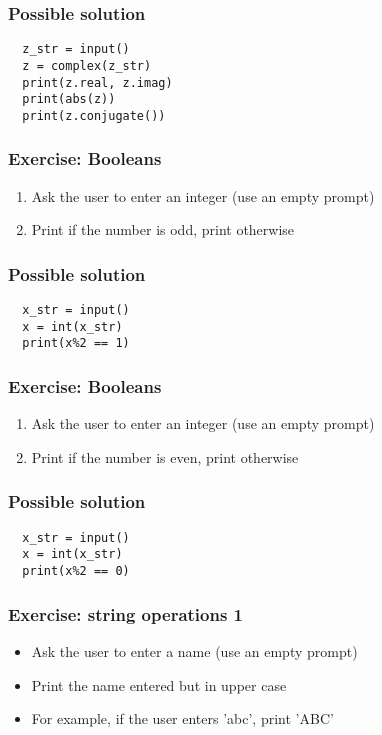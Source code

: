 \documentclass[14pt,compress]{beamer}
\begin{document}
\begin{frame}
\frametitle{Possible solution}
\begin{lstlisting}
  z_str = input()
  z = complex(z_str)
  print(z.real, z.imag)
  print(abs(z))
  print(z.conjugate())
\end{lstlisting}

\end{frame}

\begin{frame}[plain]
  \frametitle{Exercise: Booleans}
  \begin{enumerate}
  \item Ask the user to enter an integer (use an empty prompt)
  \item Print  if the number is odd, print  otherwise
  \end{enumerate}
\end{frame}

\begin{frame}
\frametitle{Possible solution}
\begin{lstlisting}
  x_str = input()
  x = int(x_str)
  print(x%2 == 1)
\end{lstlisting}
\end{frame}

\begin{frame}[plain]
  \frametitle{Exercise: Booleans}
  \begin{enumerate}
  \item Ask the user to enter an integer (use an empty prompt)
  \item Print  if the number is even, print  otherwise
  \end{enumerate}
\end{frame}

\begin{frame}
\frametitle{Possible solution}
\begin{lstlisting}
  x_str = input()
  x = int(x_str)
  print(x%2 == 0)
\end{lstlisting}
\end{frame}

\begin{frame}[plain]
  \frametitle{Exercise: string operations 1}
  \begin{itemize}
  \item Ask the user to enter a name (use an empty prompt)
  \item Print the name entered but in upper case
  \item For example, if the user enters 'abc', print 'ABC'
  \end{itemize}
\end{frame}
\end{document}

